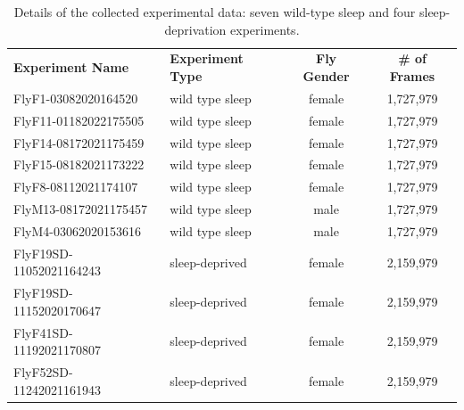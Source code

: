 \begin{table}[htb!]
	\begin{adjustbox}{width=1\textwidth}
		\begin{tabular}{l l c c}
			\toprule
			\multicolumn{1}{l}{\textbf{Experiment Name}} & \multicolumn{1}{l}{\textbf{Experiment Type}} & \multicolumn{1}{c}{\textbf{Fly Gender}} & \multicolumn{1}{c}{\textbf{\# of Frames}} \\
			\cmidrule(lr){1-1}\cmidrule(lr){2-2}\cmidrule(lr){3-3}\cmidrule(lr){4-4}
			FlyF1-03082020164520                         & wild type sleep                              & female                                  & 1,727,979                                 \\
			FlyF11-01182022175505                        & wild type sleep                              & female                                  & 1,727,979                                 \\
			FlyF14-08172021175459                        & wild type sleep                              & female                                  & 1,727,979                                 \\
			FlyF15-08182021173222                        & wild type sleep                              & female                                  & 1,727,979                                 \\
			FlyF8-08112021174107                         & wild type sleep                              & female                                  & 1,727,979                                 \\
			FlyM13-08172021175457                        & wild type sleep                              & male                                    & 1,727,979                                 \\
			FlyM4-03062020153616                         & wild type sleep                              & male                                    & 1,727,979                                 \\
			FlyF19SD-11052021164243                      & sleep-deprived                               & female                                  & 2,159,979                                 \\
			FlyF19SD-11152020170647                      & sleep-deprived                               & female                                  & 2,159,979                                 \\
			FlyF41SD-11192021170807                      & sleep-deprived                               & female                                  & 2,159,979                                 \\
			FlyF52SD-11242021161943                      & sleep-deprived                               & female                                  & 2,159,979                                 \\
			\bottomrule
		\end{tabular}
	\end{adjustbox}
	\caption{Details of the collected experimental data: seven wild-type sleep and four sleep-deprivation experiments. \label{table:experiment-details}}
\end{table}

